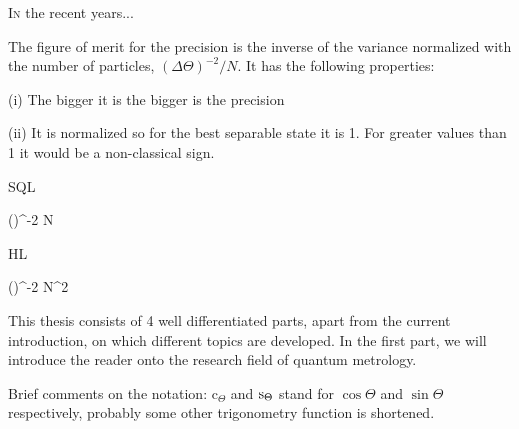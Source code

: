 \lettrine[lines=2, findent=3pt,nindent=0pt]{I}{n} the recent years...

The figure of merit for the precision is the inverse of the variance normalized with the number of particles, $(\Delta \Theta)^{-2}/N$. It has the following properties:

(i) The bigger it is the bigger is the precision

(ii) It is normalized so for the best separable state it is 1.
For greater values than 1 it would be a non-classical sign.

SQL

\be
  (\Delta \Theta)^{-2} \le N
\ee

HL

\be
  (\Delta \Theta)^{-2} \le N^2
\ee

This thesis consists of 4 well differentiated parts, apart from the current introduction, on which different topics are developed.
In the first part, we will introduce the reader onto the research field of quantum metrology.

Brief comments on the notation: $\text{c}_{\Theta}$ and ${\rm s}_{\Theta}$ stand for $\cos\Theta$ and $\sin\Theta$ respectively, probably some other trigonometry function is shortened. 
